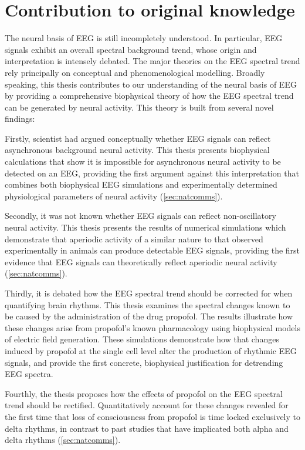\chapter*{Contribution to original knowledge}

The neural basis of EEG is still incompletely understood. In particular, EEG signals exhibit an overall spectral background trend, whose origin and interpretation is intensely debated. The major theories on the EEG spectral trend rely principally on conceptual and phenomenological modelling. Broadly speaking, this thesis contributes to our understanding of the neural basis of EEG by providing a comprehensive biophysical theory of how the EEG spectral trend can be generated by neural activity. This theory is built from several novel findings:

Firstly, scientist had argued conceptually whether EEG signals can reflect asynchronous background neural activity. This thesis presents biophysical calculations that show it is impossible for asynchronous neural activity to be detected on an EEG, providing the first argument against this interpretation that combines both biophysical EEG simulations and experimentally determined physiological parameters of neural activity (\autoref{sec:natcomms}). 

Secondly, it was not known whether EEG signals can reflect non-oscillatory neural activity. This thesis presents the results of numerical simulations which demonstrate that aperiodic activity of a similar nature to that observed experimentally in animals can produce detectable EEG signals, providing the first evidence that EEG signals can theoretically reflect aperiodic neural activity (\autoref{sec:natcomms}).

Thirdly, it is debated how the EEG spectral trend should be corrected for when quantifying brain rhythms. This thesis examines the spectral changes known to be caused by the administration of the drug propofol. The results illustrate how these changes arise from propofol's known pharmacology using biophysical models of electric field generation. These simulations demonstrate how that changes induced by propofol at the single cell level alter the production of rhythmic EEG signals, and provide the first concrete, biophysical justification for detrending EEG spectra.

Fourthly, the thesis proposes how the effects of propofol on the EEG spectral trend should be rectified. Quantitatively account for these changes revealed for the first time that loss of consciousness from propofol is time locked exclusively to delta rhythms, in contrast to past studies that have implicated both alpha and delta rhythms  (\autoref{sec:natcomms}).

